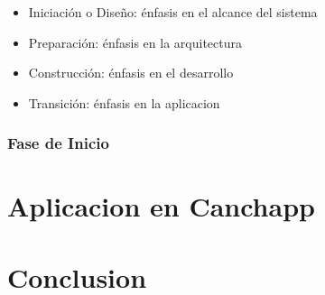 \documentclass[spanish]{udpreport}
\begin{document}
\begin{itemize}
\item Iniciación o Diseño: énfasis en el alcance del sistema
\item Preparación: énfasis en la arquitectura
\item Construcción: énfasis en el desarrollo
\item Transición: énfasis en la aplicacion

\end{itemize}

\subsection{Fase de Inicio}


\chapter{Aplicacion en Canchapp}

\chapter{Conclusion}


\end{document}
